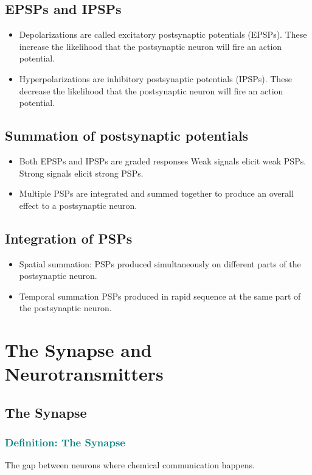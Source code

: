 \documentclass[12pt,a4paper]{article}
\newcommand{\definition}[1]{\subsubsection*{\textcolor{teal}{Definition: #1}}}
\begin{document}
	\subsection{EPSPs and IPSPs}
	
	\begin{itemize}
		\item Depolarizations are called excitatory postsynaptic potentials (EPSPs).
		\subitem These increase the likelihood that the postsynaptic neuron will fire an action potential. 
		\item Hyperpolarizations are inhibitory postsynaptic potentials (IPSPs).
		\subitem These decrease the likelihood that the postsynaptic neuron will fire an action potential. 
	\end{itemize}
	
	\subsection{Summation of postsynaptic potentials}
	
	\begin{itemize}
		\item Both EPSPs and IPSPs are graded responses
		\subitem Weak signals elicit weak PSPs. 
		\subitem Strong signals elicit strong PSPs. 
		\item Multiple PSPs are integrated and summed together to produce an overall effect to a postsynaptic neuron. 
	\end{itemize}
	
	\subsection{Integration of PSPs}
	
	\begin{itemize}
		\item Spatial summation: PSPs produced simultaneously on different parts of the postsynaptic neuron. 
		\item Temporal summation PSPs produced in rapid sequence at the same part of the postsynaptic neuron. 
	\end{itemize}
	
	\section{The Synapse and Neurotransmitters}
	
	\subsection{The Synapse}
	\definition{The Synapse} The gap between neurons where chemical communication happens. 
\end{document}
